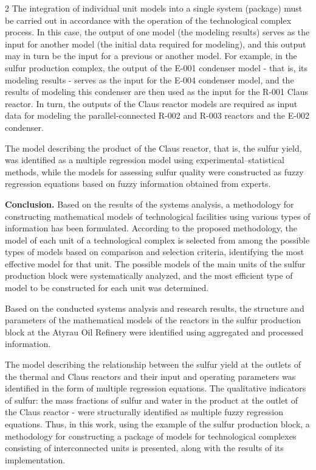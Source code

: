 \begin{multicols}{2}
The integration of individual unit models into a single system (package)
must be carried out in accordance with the operation of the
technological complex process. In this case, the output of one model
(the modeling results) serves as the input for another model (the
initial data required for modeling), and this output may in turn be the
input for a previous or another model. For example, in the sulfur
production complex, the output of the E-001 condenser model - that is,
its modeling results - serves as the input for the E-004 condenser
model, and the results of modeling this condenser are then used as the
input for the R-001 Claus reactor. In turn, the outputs of the Claus
reactor models are required as input data for modeling the
parallel-connected R-002 and R-003 reactors and the E-002 condenser.

The model describing the product of the Claus reactor, that is, the
sulfur yield, was identified as a multiple regression model using
experimental--statistical methods, while the models for assessing sulfur
quality were constructed as fuzzy regression equations based on fuzzy
information obtained from experts.

{\bfseries Conclusion.} Based on the results of the systems analysis, a
methodology for constructing mathematical models of technological
facilities using various types of information has been formulated.
According to the proposed methodology, the model of each unit of a
technological complex is selected from among the possible types of
models based on comparison and selection criteria, identifying the most
effective model for that unit. The possible models of the main units of
the sulfur production block were systematically analyzed, and the most
efficient type of model to be constructed for each unit was determined.

Based on the conducted systems analysis and research results, the
structure and parameters of the mathematical models of the reactors in
the sulfur production block at the Atyrau Oil Refinery were identified
using aggregated and processed information.

The model describing the relationship between the sulfur yield at the
outlets of the thermal and Claus reactors and their input and operating
parameters was identified in the form of multiple regression equations.
The qualitative indicators of sulfur: the mass fractions of sulfur and
water in the product at the outlet of the Claus reactor - were
structurally identified as multiple fuzzy regression equations. Thus, in
this work, using the example of the sulfur production block, a
methodology for constructing a package of models for technological
complexes consisting of interconnected units is presented, along with
the results of its implementation.
\end{multicols}

